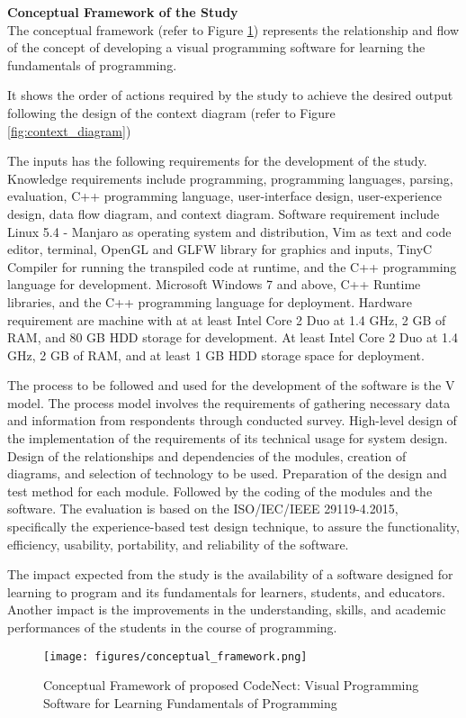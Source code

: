 \flushleft
\textbf{Conceptual Framework of the Study}\\

\justifying
\parx
The conceptual framework (refer to Figure \ref{fig:conceptual_framework}) represents the relationship
and flow of the concept of developing a visual programming software for learning the
fundamentals of programming.

\parx
It shows the order of actions required by the study to achieve the desired
output following the design of the context diagram (refer to Figure \ref{fig:context_diagram})

\parx
The inputs has the following requirements for the development of the study.
Knowledge requirements include programming, programming languages, parsing,
evaluation, C++ programming language, user-interface design, user-experience
design, data flow diagram, and context diagram.  Software requirement include
Linux 5.4 - Manjaro as operating system and distribution, Vim as text and code
editor, terminal, OpenGL and GLFW library for graphics and inputs, TinyC
Compiler for running the transpiled code at runtime, and the C++ programming
language for development. Microsoft Windows 7 and above, C++ Runtime libraries,
and the C++ programming language for deployment.  Hardware requirement are
machine with at at least Intel Core 2 Duo at 1.4 GHz, 2 GB of RAM, and 80 GB
HDD storage for development. At least Intel Core 2 Duo at 1.4 GHz, 2 GB of RAM,
and at least 1 GB HDD storage space for deployment.

\parx
The process to be followed and used for the development of the software is the V model.
The process model involves the requirements of gathering necessary data and information
from respondents through conducted survey. High-level design of the implementation of
the requirements of its technical usage for system design. Design of the relationships
and dependencies of the modules, creation of diagrams, and selection of technology to
be used. Preparation of the design and test method for each module. Followed by the
coding of the modules and the software. The evaluation is based on the ISO/IEC/IEEE
29119-4.2015, specifically the experience-based test design technique, to assure the
functionality, efficiency, usability, portability, and reliability of the software.

\parx
The impact expected from the study is the availability of a software designed for
learning to program and its fundamentals for learners, students, and educators.
Another impact is the improvements in the understanding, skills, and academic
performances of the students in the course of programming.

\begin{figure}[H]
	\centering
	\captionsetup{justification=centering}
	\texttt{[image: figures/conceptual\_framework.png]}
	\caption[Conceptual Framework]{Conceptual Framework of proposed CodeNect: Visual Programming Software for Learning Fundamentals of Programming}
	\label{fig:conceptual_framework}
\end{figure}
